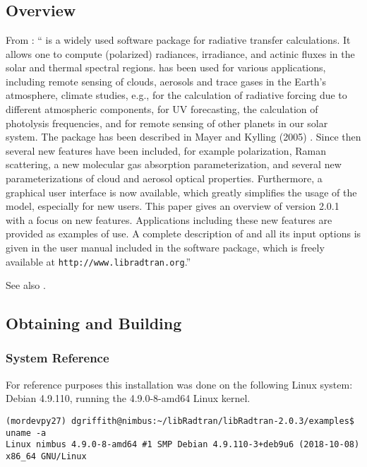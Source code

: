 

\chapter{\libradtran{}}
\label{chap:libRadtran}


\section{\libradtran{} Overview}

From \cite{EmdeLibRadtran2016}:
``\libradtran{} is a widely used software package for
radiative transfer calculations. It allows one to compute (polarized) radiances, irradiance, and actinic fluxes in the solar and thermal spectral regions. \libradtran{} has been used
for various applications, including remote sensing of clouds,
aerosols and trace gases in the Earth’s atmosphere, climate
studies, e.g., for the calculation of radiative forcing due to
different atmospheric components, for UV forecasting, the
calculation of photolysis frequencies, and for remote sensing
of other planets in our solar system. The package has been
described in Mayer and Kylling (2005) \cite{libRadtran2005}. Since then several
new features have been included, for example polarization,
Raman scattering, a new molecular gas absorption parameterization, and several new parameterizations of cloud and
aerosol optical properties. Furthermore, a graphical user interface is now available, which greatly simplifies the usage
of the model, especially for new users. This paper gives an
overview of \libradtran{} version 2.0.1 with a focus on new features. Applications including these new features are provided
as examples of use. A complete description of \libradtran{} and
all its input options is given in the user manual included in
the \libradtran{} software package, which is freely available at
\lstinline{http://www.libradtran.org}.''

See also 
\cite{libRadtran2005,libRadTranUserGuide2012,libRadtranDownload2020,libRadtranmuenchen2020}.


\section{Obtaining and Building \libradtran{}}

\subsection{System Reference}
For reference purposes this installation was done on the following Linux system: Debian 4.9.110, running the 4.9.0-8-amd64 Linux kernel.
\begin{lstlisting}[style=tinysize]
(mordevpy27) dgriffith@nimbus:~/libRadtran/libRadtran-2.0.3/examples$ uname -a
Linux nimbus 4.9.0-8-amd64 #1 SMP Debian 4.9.110-3+deb9u6 (2018-10-08) x86_64 GNU/Linux
\end{lstlisting}

